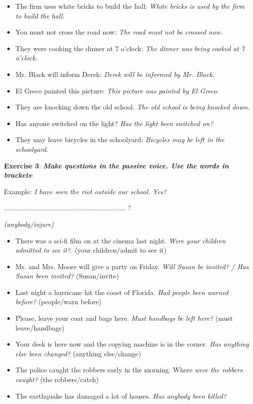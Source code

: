 \begin{itemize}

\item The firm uses white bricks to build the hall: \textit{White bricks is used by the firm to build the hall}.
\item You must not cross the road now: \textit{The road must not be crossed now}.
\item They were cooking the dinner at 7 o'clock: \textit{The dinner was being cooked at 7 o'clock}.
\item Mr. Black will inform Derek: \textit{Derek will be informed by Mr. Black}.
\item El Greco painted this picture: \textit{This picture was painted by El Greco}.
\item They are knocking down the old school. \textit{The old school is being knocked down}.
\item Has anyone switched on the light? \textit{Has the light been switched on?}
\item They may leave bicycles in the schoolyard: \textit{Bicycles may be left in the schoolyard}.

\end{itemize}

\textbf{Exercise 3}: \textit{\textbf{Make questions in the passive voice. Use the words in brackets}}:

Example:
\textit{I have seen the riot outside our school. Yes?}

 ................................................................ ?
 
\textit{(anybody/injure)}


\begin{itemize}

\item There was a sci-fi film on at the cinema last night. \textit{Were your children admitted to see it?}. (your children/admit to see it)
\item Mr. and Mrs. Moore will give a party on Friday. \textit{Will Susan be invited? / Has Susan been invited?} (Susan/invite)
\item Last night a hurricane hit the coast of Florida. \textit{Had people been warned before?} (people/warn before)
\item Please, leave your coat and bags here. \textit{Must handbags be left here?} (must leave/handbags)
\item Your desk is here now and the copying machine is in the corner. \textit{Has anything else been changed?} (anything else/change)
\item The police caught the robbers early in the morning. Where \textit{were the robbers caught?} (the robbers/catch)
\item The earthquake has damaged a lot of houses. \textit{Has anybody been killed?}

\end{itemize}

